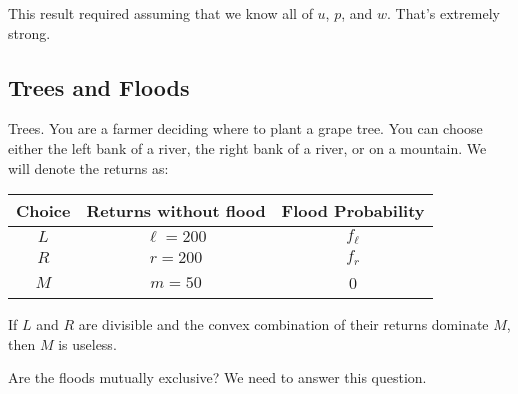 \documentclass[12pt]{article}
\begin{document}
\begin{remark}
	This result required assuming that we know all of $u$, $p$, and $w$. That's extremely strong.
\end{remark}

\subsection{Trees and Floods}

\begin{example}
	Trees. You are a farmer deciding where to plant a grape tree. You can choose either the left bank of a river, the right bank of a river, or on a mountain. We will denote the returns as:
	
	\begin{table}[H]
		\centering
		\begin{tabular}{|c|c|c|}
			\hline
			Choice & Returns without flood & Flood Probability\\
			\hline 
			$L$ & $\ell = 200$ & $f_\ell$\\
			\hline
			$R$ & $r = 200$ & $f_r$ \\
			\hline 
			$M$ & $m = 50$ & 0 \\
			\hline 
		\end{tabular}
	\end{table}
\end{example}

\begin{remark}
	If $L$ and $R$ are divisible and the convex combination of their returns dominate $M$, then $M$ is useless.
\end{remark}

\begin{remark}
	Are the floods mutually exclusive? We need to answer this question.
\end{remark}
\end{document}
